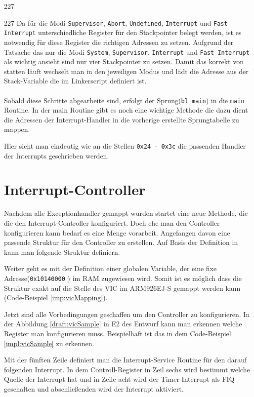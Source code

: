 \begin{dinglist}{227}
\begin{dinglist}{227}
Da f\"ur die Modi \texttt{Supervisor}, \texttt{Abort}, \texttt{Undefined}, \texttt{Interrupt} und \texttt{Fast Interrupt} unterschiedliche Register f\"ur den Stackpointer belegt werden, ist es notwendig f\"ur diese Register die richtigen Adressen zu setzen. Aufgrund der Tatsache das \mops nur die Modi \texttt{System}, \texttt{Supervisor}, \texttt{Interrupt} und \texttt{Fast Interrupt} als wichtig ansieht sind nur vier Stackpointer zu setzen. Damit das korrekt von statten l\"auft wechselt man in den jeweiligen Modus und l\"adt die Adresse aus der  Stack-Variable die im Linkerscript definiert ist.\\\\
Sobald diese Schritte abgearbeite sind, erfolgt der Sprung(\texttt{bl main}) in die \texttt{main} Routine.
In der main Routine gibt es noch eine wichtige Methode die dazu dient die Adressen der Interrupt-Handler in die vorherige erstellte Sprungtabelle zu mappen.
 
Hier sieht man eindeutig wie an die Stellen \texttt{0x24 - 0x3c} die passenden Handler der Interrupts geschrieben werden. 
\end{dinglist}
\end{dinglist} 
\section{Interrupt-Controller}
Nachdem alle Exceptionhandler gemappt wurden startet eine neue Methode, die die den Interrupt-Controller konfiguriert. Doch ehe man den Controller konfigurieren kann bedarf es eine Menge vorarbeit. Angefangen davon eine passende Struktur f\"ur den Controller zu erstellen. Auf Basis der Definition in \cite[35]{vic} kann man folgende Struktur definiern.

Weiter geht es mit der Definition einer globalen Variable, der eine fixe Adresse(\texttt{0x10140000} \parencite[vgl. Tabelle 4-37][223]{archManI}) im RAM zugewiesen wird. Somit ist es m\"oglich dass die Struktur exakt auf die Stelle des VIC im ARM926EJ-S gemappt werden kann (Code-Beispiel \ref{imp:vicMapping}). 

Jetzt sind alle Vorbedingungen geschaffen um den Controller zu konfigurieren. In der Abbildung \ref{draft:vicSample} in E2 des Entwurf kann man erkennen welche Register man konfigurieren muss. Beispielhaft ist das in dem Code-Beispiel  \ref{impl:vicSample} zu erkennen.

Mit der f\"unften Zeile definiert man die Interrupt-Service Routine f\"ur den darauf folgenden Interrupt. In dem Controll-Register in Zeil sechs wird bestimmt welche Quelle der Interrupt hat und in Zeile acht wird der Timer-Interrupt als FIQ geschalten und abschlie\ss enden wird der Interrupt aktiviert.
